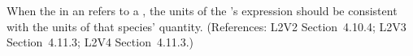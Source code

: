 When the  in an \InitialAssignment refers to a \Species,
the units of the \InitialAssignment's  expression should be
consistent with the units of that species' quantity.  (References:
L2V2 Section~4.10.4; L2V3 Section~4.11.3; L2V4 Section~4.11.3.)
